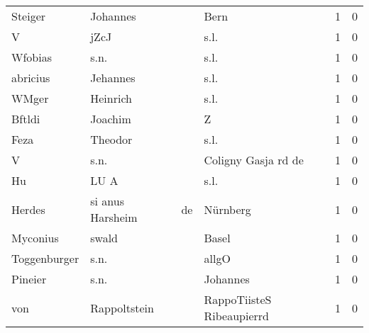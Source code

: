 \begin{tabular}{llllrr}
                  Steiger &                           Johannes &             &                                        Bern &          1 &         0 \\
                        V &                               jZcJ &             &                                        s.l. &          1 &         0 \\
                  Wfobias &                               s.n. &             &                                        s.l. &          1 &         0 \\
                 abricius &                           Jehannes &             &                                        s.l. &          1 &         0 \\
                    WMger &                           Heinrich &             &                                        s.l. &          1 &         0 \\
                   Bftldi &                            Joachim &             &                                           Z &          1 &         0 \\
                     Feza &                            Theodor &             &                                        s.l. &          1 &         0 \\
                        V &                               s.n. &             &                         Coligny Gasja rd de &          1 &         0 \\
                       Hu &                               LU A &             &                                        s.l. &          1 &         0 \\
                   Herdes &                   si anus Harsheim &          de &                                    Nürnberg &          1 &         0 \\
                 Myconius &                              swald &             &                                       Basel &          1 &         0 \\
             Toggenburger &                               s.n. &             &                                       allgO &          1 &         0 \\
                  Pineier &                               s.n. &             &                                    Johannes &          1 &         0 \\
                      von &                       Rappoltstein &             &                   RappoTiisteS Ribeaupierrd &          1 &         0 \\

\end{tabular}
